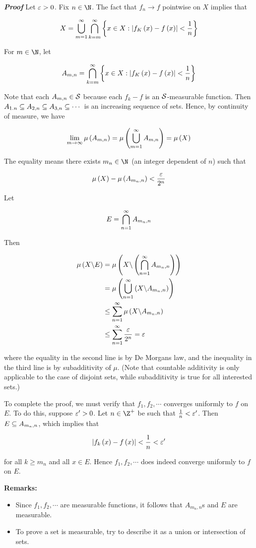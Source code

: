 \documentclass[
]{article}
\begin{document}
\emph{\textbf{Proof}} Let \(\ve>0\). Fix \(n\in\N\). The fact that
\(f_n\to f\) pointwise on \(X\) implies that

\[X = \uinf[m]\bigcap_{k = m}^{\infty}\brace{x\in X: \abs{f_K\pr{x}-f\pr x}<\frac1n}\]

For \(m\in\N\), let

\[A_{m,n} = \bigcap_{k = m}^{\infty}\brace{x\in X: \abs{f_K\pr{x}-f\pr x}<\frac1n}\]

Note that each \(A_{m,n}\in \S\) because each \(f_k-f\) is an
\(\S\)-measurable function. Then
\(A_{1.n}\se A_{2,n}\se A_{3,n}\se \cdots\) is an increasing sequence of
sets. Hence, by continuity of measure, we have

\[\lim_{m\to\infty}\mu\pr{A_{m,n}} = \lm{\uinf[m]A_{m,n}} = \lm{X}\]

The equality means there exists \(m_n\in \N\) (an integer dependent of
\(n\)) such that

\[\lm{X}-\lm{A_{m_n,n}}<\frac{\ve}{2^n}\]

Let

\[E = \iinf[n]A_{m_n,n}\]

Then

\[\ba
\lm{X\c E} & = \lm{X\c \pr{\iinf[n]A_{m_n,n}}}\\
& = \lm{\uinf[n]\pr{X\c A_{m_n,n}}}\\
& \le \sinf[n]\lm{X\c A_{m_n,n}} \\
& \le \sinf[n]\frac{\ve}{2^n} = \ve
\ea\]

where the equality in the second line is by De Morgan\textquotesingle s
law, and the inequality in the third line is by subadditivity of
\(\mu\). (Note that countable additivity is only applicable to the case
of disjoint sets, while subadditivity is true for all interested sets.)

To complete the proof, we must verify that \(f_1,f_2,\cdots\) converges
uniformly to \(f\) on \(E\). To do this, suppose \(\ve'>0\). Let
\(n\in \Z^+\) be such that \(\frac1n<\ve'\). Then \(E\se A_{m_n,n}\),
which implies that

\[\abs{f_k\pr x-f\pr x}<\frac1n<\ve'\]

for all \(k\ge m_n\) and all \(x\in E\). Hence \(f_1,f_2,\cdots\) does
indeed converge uniformly to \(f\) on \(E\).

\textbf{Remarks:}

\begin{itemize}
\item
  Since \(f_1,f_2,\cdots\) are measurable functions, it follows that
  \(A_{m_n,n}\)\textquotesingle s and \(E\) are measurable.
\item
  To prove a set is measurable, try to describe it as a union or
  intersection of sets.
\end{itemize}
\end{document}
